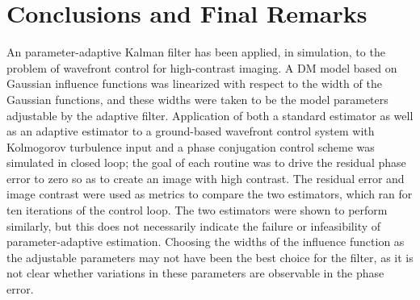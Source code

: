 \documentclass[11pt,reqno]{amsart}
\begin{document}
\section{Conclusions and Final Remarks}\label{sec:conclusion}
An parameter-adaptive Kalman filter has been applied, in simulation, to the problem of wavefront control for high-contrast imaging.  A DM model based on Gaussian influence functions was linearized with respect to the width of the Gaussian functions, and these widths were taken to be the model parameters adjustable by the adaptive filter.  Application of both a standard estimator as well as an adaptive estimator to a ground-based wavefront control system with Kolmogorov turbulence input and a phase conjugation control scheme was simulated in closed loop; the goal of each routine was to drive the residual phase error to zero so as to create an image with high contrast.  The residual error and image contrast were used as metrics to compare the two estimators, which ran for ten iterations of the control loop.  The two estimators were shown to perform similarly, but this does not necessarily indicate the failure or infeasibility of parameter-adaptive estimation.  Choosing the widths of the influence function as the adjustable parameters may not have been the best choice for the filter, as it is not clear whether variations in these parameters are observable in the phase error.





\end{document}
